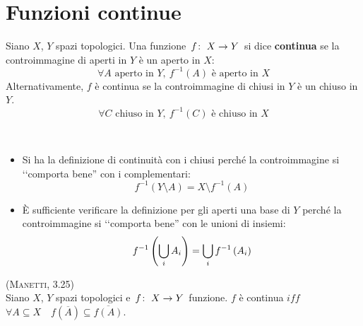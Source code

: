 \section{Funzioni continue}
\begin{define}
	Siano $X$, $Y$ spazi topologici. Una funzione $\funz{f}{X}{Y}$ si dice \textbf{continua} se la controimmagine di aperti in $Y$ è un aperto in $X$:
	\begin{equation}
		\forall A\text{ aperto in } Y,\ f^{-1}\left(A\right) \text{ è aperto in } X
	\end{equation}
	Alternativamente, $f$ è continua se la controimmagine di chiusi in $Y$ è un chiuso in $Y$.
	\begin{equation}
		\forall C\text{ chiuso in } Y,\ f^{-1}\left(C\right) \text{ è chiuso in } X
	\end{equation}
\end{define}
\begin{observe}~{}
	\begin{itemize}
		\item Si ha la definizione di continuità con i chiusi perché la controimmagine si ‘‘comporta bene'' con i complementari:
		\begin{equation*}
			f^{-1}\left(Y\setminus A\right)=X\setminus f^{-1}\left(A\right)
		\end{equation*}
		\item È sufficiente verificare la definizione per gli aperti una base di $Y$ perché la controimmagine si ‘‘comporta bene'' con le unioni di insiemi:
		\begin{equation*}
			f^{-1}\left(\mathop{{\bigcup}}\displaylimits_{i}A_i\right)=\mathop{{\bigcup}}\displaylimits_{i}f^{-1}\left(A_i\right)
		\end{equation*}
	\end{itemize}
\end{observe}
\begin{lemming}\textsc{(Manetti, 3.25)}\\
	Siano $X$, $Y$ spazi topologici e $\funz{f}{X}{Y}$ funzione.
	$f$ è continua $iff$ $\forall A\subseteq X\quad f\left(\overline{A}\right)\subseteq\overline{f\left(A\right)}$.
\end{lemming}
